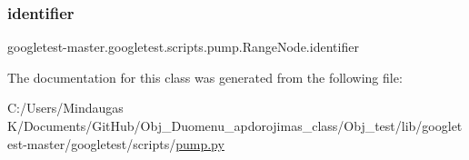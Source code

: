 \mbox{\label{classgoogletest-master_1_1googletest_1_1scripts_1_1pump_1_1_range_node_a8d45a43acf8111c5c9584e7c89135d62}} 
\subsubsection{\texorpdfstring{identifier}{identifier}}
{\footnotesize\ttfamily googletest-\/master.\+googletest.\+scripts.\+pump.\+Range\+Node.\+identifier}



The documentation for this class was generated from the following file\+:\begin{DoxyCompactItemize}
\item 
C\+:/\+Users/\+Mindaugas K/\+Documents/\+Git\+Hub/\+Obj\+\_\+\+Duomenu\+\_\+apdorojimas\+\_\+class/\+Obj\+\_\+test/lib/googletest-\/master/googletest/scripts/\mbox{\hyperlink{_obj__test_2lib_2googletest-master_2googletest_2scripts_2pump_8py}{pump.\+py}}\end{DoxyCompactItemize}
